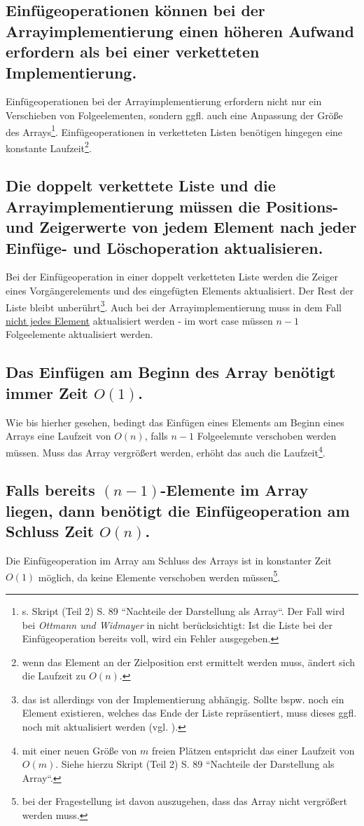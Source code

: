 \subsection*{Einfügeoperationen können bei der Arrayimplementierung einen höheren Aufwand erfordern als bei einer verketteten Implementierung.}
Einfügeoperationen bei der Arrayimplementierung erfordern nicht nur ein Verschieben von Folgeelementen, sondern {ggfl.} auch eine Anpassung der Größe des Arrays\footnote{
    s. Skript (Teil 2) S. 89 ``Nachteile der Darstellung als Array``. Der Fall wird bei \textit{Ottmann und Widmayer} in \cite[32]{OW17a} nicht berücksichtigt: Ist die Liste bei der Einfügeoperation bereits voll, wird ein Fehler ausgegeben.
}.
Einfügeoperationen in verketteten Listen benötigen hingegen eine konstante Laufzeit\footnote{
    wenn das Element an der Zielposition erst ermittelt werden muss, ändert sich die Laufzeit zu $O(n)$.
}.

\subsection*{Die doppelt verkettete Liste und die Arrayimplementierung müssen die Positions- und Zeigerwerte von jedem Element nach jeder Einfüge- und Löschoperation aktualisieren.}
Bei der Einfügeoperation in einer doppelt verketteten Liste werden die Zeiger eines Vorgängerelements und des eingefügten Elements aktualisiert.
Der Rest der Liste bleibt unberührt\footnote{
das ist allerdings von der Implementierung abhängig. Sollte bspw. noch ein Element existieren, welches das Ende der Liste repräsentiert, muss dieses ggfl. noch mit aktualisiert werden (vgl. \cite[35 ff.]{OW17a}).
}.
Auch bei der Arrayimplementierung muss in dem Fall \underline{nicht jedes Element} aktualisiert werden - im wort case müssen $n-1$ Folgeelemente aktualisiert werden.


\subsection*{Das Einfügen am Beginn des Array benötigt immer Zeit $O(1)$.}
Wie bis hierher gesehen, bedingt das Einfügen eines Elements am Beginn eines Arrays eine Laufzeit von $O(n)$, falls $n-1$ Folgeelemnte verschoben werden müssen.
Muss das Array vergrößert werden, erhöht das auch die Laufzeit\footnote{
    mit einer neuen Größe von $m$ freien Plätzen entspricht das einer Laufzeit von $O(m)$. Siehe hierzu Skript (Teil 2) S. 89 ``Nachteile der Darstellung als Array``.
}.

\subsection*{Falls bereits $(n-1)$-Elemente im Array liegen, dann benötigt die Einfügeoperation am Schluss Zeit $O(n)$.}
Die Einfügeoperation im Array am Schluss des Arrays ist in konstanter Zeit $O(1)$ möglich, da keine Elemente verschoben werden müssen\footnote{
    bei der Fragestellung ist davon auszugehen, dass das Array nicht vergrößert werden muss.
}.

